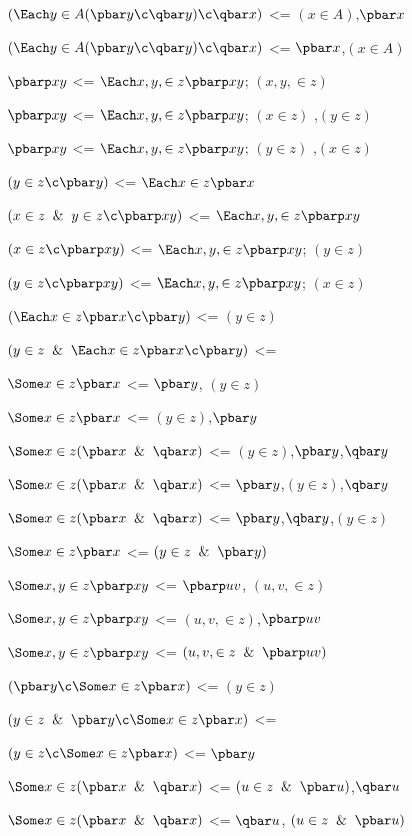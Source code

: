 $(\Each y \in A (\pbar y \c \qbar y) \c  \qbar x)$ <= $(x \in A)$,$\pbar x$

$(\Each y \in A (\pbar y \c \qbar y) \c  \qbar x)$ <= $\pbar x$,$(x \in A)$

$\pbarp xy$ <= $\Each x,y, \in z \pbarp  xy$; $(x,y, \in z)$ 

$\pbarp xy$ <= $\Each x,y, \in z \pbarp  xy$; $(x \in z)$ ,$(y\in z)$

$\pbarp xy$ <= $\Each x,y, \in z \pbarp  xy$; $(y \in z)$ ,$(x\in z)$

$(y \in z \c \pbar y)$ <= $\Each x \in z \pbar x$

$(x\in z \And y \in z \c \pbarp xy)$ <= $\Each x,y, \in z \pbarp xy$

$(x\in z \c \pbarp xy)$ <= $\Each x,y, \in z \pbarp xy$; $(y \in z)$

$(y\in z \c \pbarp xy)$ <= $\Each x,y, \in z \pbarp xy$; $(x \in z)$

$(\Each x \in z \pbar x \c \pbar y)$ <= $(y \in z)$

$(y \in z \And \Each x \in z \pbar x \c \pbar y)$ <=

$\Some x \in z \pbar x$ <= $\pbar y$, $(y \in z)$

$\Some x \in z \pbar x$ <=  $(y \in z)$,$\pbar y$

$\Some x \in z (\pbar x \And \qbar x)$ <=  $(y \in z)$,$\pbar y$,$\qbar y$

$\Some x \in z (\pbar x \And \qbar x)$ <=  $\pbar y$,$(y \in z)$,$\qbar y$

$\Some x \in z (\pbar x \And \qbar x)$ <=  $\pbar y$,$\qbar y$,$(y \in z)$

$\Some x \in z \pbar x$ <=  $(y \in z\And \pbar y)$

$\Some x,y \in z \pbarp xy$ <= $\pbarp uv$, $(u,v, \in z)$

$\Some x,y \in z \pbarp xy$ <=  $(u,v, \in z)$,$\pbarp uv$

$\Some x,y \in z \pbarp xy$ <=  $(u,v, \in z\And \pbarp uv)$

$(\pbar y \c \Some x \in z \pbar x)$ <=  $(y \in z)$

$(y \in z \And \pbar y \c \Some x \in z \pbar x)$ <= 

$(y \in z \c \Some x \in z \pbar x)$ <=  $\pbar y$

$\Some x \in z (\pbar x \And \qbar x)$ <=  $(u \in z\And \pbar u)$,$\qbar u$

$\Some x \in z (\pbar x \And \qbar x)$ <=  $\qbar u$, $(u \in z\And \pbar u)$

